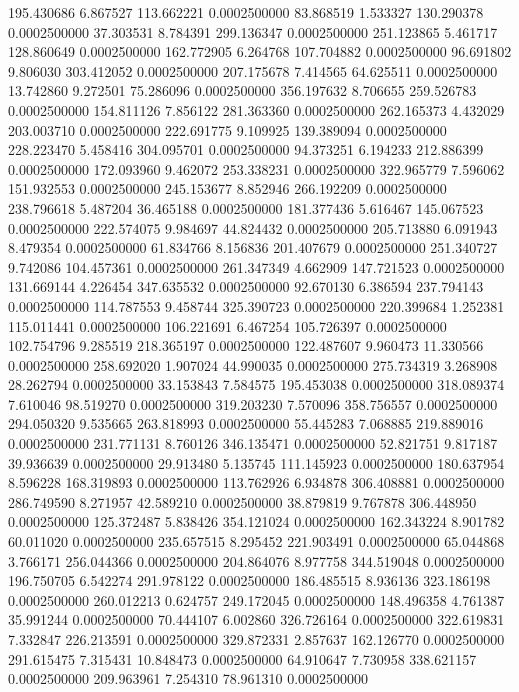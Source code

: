 195.430686 6.867527 113.662221 0.0002500000
83.868519 1.533327 130.290378 0.0002500000
37.303531 8.784391 299.136347 0.0002500000
251.123865 5.461717 128.860649 0.0002500000
162.772905 6.264768 107.704882 0.0002500000
96.691802 9.806030 303.412052 0.0002500000
207.175678 7.414565 64.625511 0.0002500000
13.742860 9.272501 75.286096 0.0002500000
356.197632 8.706655 259.526783 0.0002500000
154.811126 7.856122 281.363360 0.0002500000
262.165373 4.432029 203.003710 0.0002500000
222.691775 9.109925 139.389094 0.0002500000
228.223470 5.458416 304.095701 0.0002500000
94.373251 6.194233 212.886399 0.0002500000
172.093960 9.462072 253.338231 0.0002500000
322.965779 7.596062 151.932553 0.0002500000
245.153677 8.852946 266.192209 0.0002500000
238.796618 5.487204 36.465188 0.0002500000
181.377436 5.616467 145.067523 0.0002500000
222.574075 9.984697 44.824432 0.0002500000
205.713880 6.091943 8.479354 0.0002500000
61.834766 8.156836 201.407679 0.0002500000
251.340727 9.742086 104.457361 0.0002500000
261.347349 4.662909 147.721523 0.0002500000
131.669144 4.226454 347.635532 0.0002500000
92.670130 6.386594 237.794143 0.0002500000
114.787553 9.458744 325.390723 0.0002500000
220.399684 1.252381 115.011441 0.0002500000
106.221691 6.467254 105.726397 0.0002500000
102.754796 9.285519 218.365197 0.0002500000
122.487607 9.960473 11.330566 0.0002500000
258.692020 1.907024 44.990035 0.0002500000
275.734319 3.268908 28.262794 0.0002500000
33.153843 7.584575 195.453038 0.0002500000
318.089374 7.610046 98.519270 0.0002500000
319.203230 7.570096 358.756557 0.0002500000
294.050320 9.535665 263.818993 0.0002500000
55.445283 7.068885 219.889016 0.0002500000
231.771131 8.760126 346.135471 0.0002500000
52.821751 9.817187 39.936639 0.0002500000
29.913480 5.135745 111.145923 0.0002500000
180.637954 8.596228 168.319893 0.0002500000
113.762926 6.934878 306.408881 0.0002500000
286.749590 8.271957 42.589210 0.0002500000
38.879819 9.767878 306.448950 0.0002500000
125.372487 5.838426 354.121024 0.0002500000
162.343224 8.901782 60.011020 0.0002500000
235.657515 8.295452 221.903491 0.0002500000
65.044868 3.766171 256.044366 0.0002500000
204.864076 8.977758 344.519048 0.0002500000
196.750705 6.542274 291.978122 0.0002500000
186.485515 8.936136 323.186198 0.0002500000
260.012213 0.624757 249.172045 0.0002500000
148.496358 4.761387 35.991244 0.0002500000
70.444107 6.002860 326.726164 0.0002500000
322.619831 7.332847 226.213591 0.0002500000
329.872331 2.857637 162.126770 0.0002500000
291.615475 7.315431 10.848473 0.0002500000
64.910647 7.730958 338.621157 0.0002500000
209.963961 7.254310 78.961310 0.0002500000
